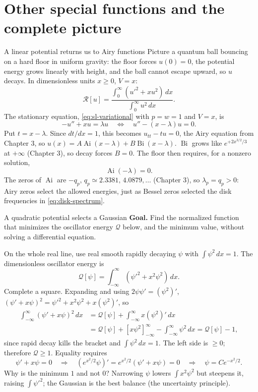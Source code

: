 \documentclass[11pt]{beamer}
\newcommand{\dd}{\,d}
\newcommand{\Q}{\mathcal Q}
\newcommand{\R}{\mathcal R}
\newcommand{\Ai}{\operatorname{Ai}}
\newcommand{\Bi}{\operatorname{Bi}}
\begin{document}
\section{Other special functions and the complete picture}

\begin{frame}{A linear potential returns us to Airy functions}
\small
Picture a quantum ball bouncing on a hard floor in uniform gravity: the floor forces
$u(0)=0$, the potential energy grows linearly with height, and the ball cannot escape upward,
so $u$ decays. In dimensionless units $x\ge0$, $V=x$:
\[
 \R[u]=\frac{\int_0^\infty(u'^2+xu^2)\dd x}{\int_0^\infty u^2\dd x}.
\]
The stationary equation, \eqref{eq:sl-variational} with $p=w=1$ and $V=x$, is
\[
 -u''+xu=\lambda u\quad\Longleftrightarrow\quad u''-(x-\lambda)u=0.
\]
Put $t=x-\lambda$. Since $dt/dx=1$, this becomes
$u_{tt}-tu=0$, the Airy equation from Chapter 3, so
$u(x)=A\Ai(x-\lambda)+B\Bi(x-\lambda)$.
$\Bi$ grows like $e^{+2x^{3/2}/3}$ at $+\infty$ (Chapter 3), so decay forces $B=0$.
The floor then requires, for a nonzero solution,
\[
 \Ai(-\lambda)=0 .
\]
The zeros of $\Ai$ are $-q_p$, $q_p\simeq2.3381,\,4.0879,\ldots$ (Chapter 3),
so $\lambda_p=q_p>0$: Airy zeros select the allowed energies,
just as Bessel zeros selected the disk frequencies in \eqref{eq:disk-spectrum}.
\end{frame}

\begin{frame}[allowframebreaks=1.00]{A quadratic potential selects a Gaussian}
\small
\textbf{Goal.} Find the normalized function that minimizes the oscillator energy $\Q$ below, and the
minimum value, without solving a differential equation.

On the whole real line, use real smooth rapidly decaying $\psi$ with
$\int\psi^2\dd x=1$. The dimensionless oscillator energy is
\[
 \Q[\psi]=\int_{-\infty}^{\infty}(\psi'^2+x^2\psi^2)\dd x.
\]
Complete a square. Expanding and using $2\psi\psi'=(\psi^2)'$,
$(\psi'+x\psi)^2=\psi'^2+x^2\psi^2+x(\psi^2)'$, so
\begin{align*}
 \int_{-\infty}^{\infty}(\psi'+x\psi)^2\dd x
 &=\Q[\psi]+\int_{-\infty}^{\infty}x(\psi^2)'\dd x\\
 &=\Q[\psi]+[x\psi^2]_{-\infty}^{\infty}
       -\int_{-\infty}^{\infty}\psi^2\dd x
 =\Q[\psi]-1,
\end{align*}
since rapid decay kills the bracket and $\int\psi^2\dd x=1$.
The left side is $\ge0$; therefore $\Q\ge1$. Equality requires
\[
 \psi'+x\psi=0\quad\Longrightarrow\quad
 (e^{x^2/2}\psi)'=e^{x^2/2}(\psi'+x\psi)=0\quad\Longrightarrow\quad\psi=Ce^{-x^2/2}.
\]
Why is the minimum $1$ and not $0$? Narrowing $\psi$ lowers $\int x^2\psi^2$ but steepens it,
raising $\int\psi'^2$; the Gaussian is the best balance (the uncertainty principle).
\end{frame}
\end{document}
